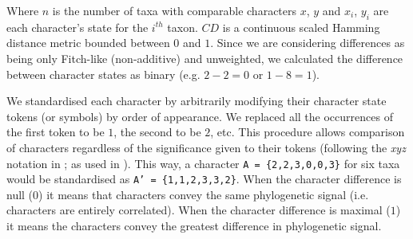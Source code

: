 \documentclass[12pt,letterpaper]{article}
\begin{document}
\noindent Where $n$ is the number of taxa with comparable characters $x$, $y$ and $x_i$, $y_i$ are each character's state for the $i^{th}$ taxon.
$CD$ is a continuous scaled Hamming distance metric bounded between $0$ and $1$.
Since we are considering differences as being only Fitch-like (non-additive) and unweighted, we calculated the difference between character states as binary %
(e.g. $2 - 2 = 0$ or $1 - 8 = 1$).

We standardised each character by arbitrarily modifying their character state tokens (or symbols) by order of appearance.
We replaced all the occurrences of the first token to be $1$, the second to be $2$, etc.
This procedure allows comparison of characters regardless of the significance given to their tokens (following the \textit{xyz} notation in \citealt{felsenstein2004inferring}; as used in \citealt{Davalos01072014}).
This way, a character \texttt{A = \{2,2,3,0,0,3\}} for six taxa would be standardised as \texttt{A' = \{1,1,2,3,3,2\}}.
When the character difference is null ($0$) it means that characters convey the same phylogenetic signal (i.e. characters are entirely correlated). 
When the character difference is maximal ($1$) it means the characters convey the greatest difference in phylogenetic signal. %
\end{document}
